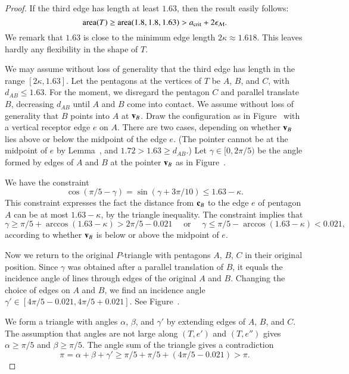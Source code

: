 \begin{proof}  
  If the third edge has length at least $1.63$, then the result easily
  follows:
\[
{\operatorname{area}}(T) \ge {\operatorname{area}}(1.8,1.8,1.63) > a_\text{crit} + 2\epsilon_{\mathcal M}.
\]
We remark that $1.63$ is close to the minimum edge length
$2\kappa\approx 1.618$.  This leaves
hardly any flexibility in the shape of $T$.

We may assume without loss of generality that the third edge has
length in the range $[2\kappa,1.63]$.  Let the pentagons at the
vertices of $T$ be $A$, $B$, and $C$, with $d_{AB}\le 1.63$.  For the
moment, we disregard the pentagon $C$ and parallel translate $B$,
decreasing $d_{AB}$ until $A$ and $B$ come into contact.  We assume
without loss of generality that $B$ points into $A$ at ${\mathbf v}_B$.  Draw
the configuration as in Figure~ with a vertical
receptor edge $e$ on $A$.  There are two cases, depending on whether
${\mathbf v}_B$ lies above or below the midpoint of the edge $e$.  (The pointer
cannot be at the midpoint of $e$ by Lemma~, and
$1.72 > 1.63 \ge d_{AB}$.)  Let $\gamma\in[0,2\pi/5)$ be the angle
formed by edges of $A$ and $B$ at the pointer ${\mathbf v}_B$ as in
Figure~.

We have the constraint
\[
\cos(\pi/5 - \gamma) =\sin(\gamma+3\pi/10) \le 1.63 - \kappa.
\]
This constraint expresses the fact the distance from ${\mathbf c}_B$ to the
edge $e$ of pentagon $A$ can be at most $1.63-\kappa$, by the triangle
inequality.  The constraint implies that
\[
\gamma \ge \pi/5 +
\arccos (1.63-\kappa) > 2\pi/5 - 0.021\quad \text{ or }\quad
%
\gamma\le \pi/5 - \arccos(1.63-\kappa) < 0.021,
\]
according to whether ${\mathbf v}_B$ is below or above the midpoint of $e$.

Now we return to the original $P$-triangle with pentagons $A$, $B$,
$C$ in their original position.  Since $\gamma$ was obtained after a
parallel translation of $B$, it equals the incidence angle of lines
through edges of the original $A$ and $B$.  Changing the choice of
edges on $A$ and $B$, we find an incidence angle  $\gamma' \in
[4\pi/5-0.021,4\pi/5+0.021]$.  See Figure~.

We form a triangle with angles $\alpha$, $\beta$, and $\gamma'$ by
extending edges of $A$, $B$, and $C$.  The assumption that angles are
not large along $(T,e')$ and $(T,e'')$ gives $\alpha\ge \pi/5$ and
$\beta\ge \pi/5$.  The angle sum of the triangle gives a contradiction
\[
\pi=\alpha+\beta+\gamma' 
\ge  \pi/5 + \pi/5 + (4\pi/5 - 0.021) > \pi.
\]

\end{proof}


